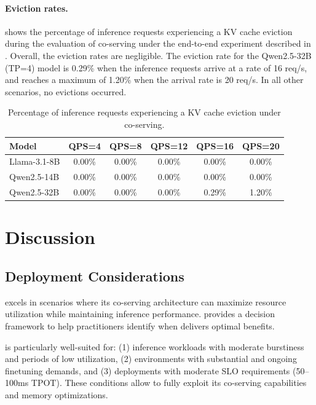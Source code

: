 \paragraph{Eviction rates.}
\label{flexllm:sec:coserving_evictions}
 shows the percentage of inference requests experiencing a KV cache eviction during the evaluation of co-serving under the end-to-end experiment described in . Overall, the eviction rates are negligible. The eviction rate for the Qwen2.5-32B (TP=4) model is 0.29\% when the inference requests arrive at a rate of 16 req/s, and reaches a maximum of 1.20\% when the arrival rate is 20 req/s. In all other scenarios, no evictions occurred.

\begin{table}[htbp]
\centering
\caption{Percentage of inference requests experiencing a KV cache eviction under co-serving.}
\label{flexllm:tab:coserving_evictions}
\begin{tabular}{lccccc}
\toprule
Model & QPS=4 & QPS=8 & QPS=12 & QPS=16 & QPS=20 \\
\midrule
Llama-3.1-8B & 0.00\% & 0.00\% & 0.00\% & 0.00\% & 0.00\% \\
Qwen2.5-14B & 0.00\% & 0.00\% & 0.00\% & 0.00\% & 0.00\% \\
Qwen2.5-32B & 0.00\% & 0.00\% & 0.00\% & 0.29\% & 1.20\% \\
\bottomrule
\end{tabular}
\end{table}

\section{Discussion}
\label{flexllm:sec:discussion}

\subsection{Deployment Considerations}
\label{flexllm:sec:deployment}

\FlexLLM excels in scenarios where its co-serving architecture can maximize resource utilization while maintaining inference performance.  provides a decision framework to help practitioners identify when \FlexLLM delivers optimal benefits.

\FlexLLM is particularly well-suited for: (1) inference workloads with moderate burstiness and periods of low utilization, (2) environments with substantial and ongoing finetuning demands, and (3) deployments with moderate SLO requirements (50--100ms TPOT). These conditions allow \FlexLLM to fully exploit its co-serving capabilities and memory optimizations.

